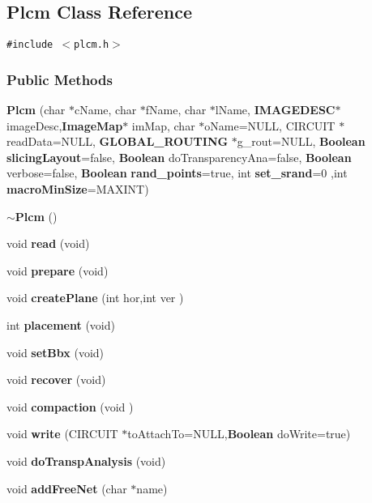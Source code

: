 \subsection{Plcm  Class Reference}
\label{Plcm}
{\tt \#include $<$plcm.h$>$}

\subsubsection*{Public Methods}
\begin{CompactItemize}
\item 
{\bf Plcm} (char $\ast$c\-Name, char $\ast$f\-Name, char $\ast$l\-Name, {\bf IMAGEDESC}$\ast$ image\-Desc,{\bf Image\-Map}$\ast$ im\-Map, char $\ast$o\-Name=NULL, CIRCUIT $\ast$read\-Data=NULL, {\bf GLOBAL\_\-ROUTING} $\ast$g\_\-rout=NULL, {\bf Boolean} {\bf slicing\-Layout}=false, {\bf Boolean} do\-Transparency\-Ana=false, {\bf Boolean} verbose=false, {\bf Boolean} {\bf rand\_\-points}=true, int {\bf set\_\-srand}=0 ,int {\bf macro\-Min\-Size}=MAXINT)
\item 
{\bf $\sim$Plcm} ()
\item 
void {\bf read} (void)
\item 
void {\bf prepare} (void)
\item 
void {\bf create\-Plane} (int hor,int ver )
\item 
int {\bf placement} (void)
\item 
void {\bf set\-Bbx} (void)
\item 
void {\bf recover} (void)
\item 
void {\bf compaction} (void )
\item 
void {\bf write} (CIRCUIT $\ast$to\-Attach\-To=NULL,{\bf Boolean} do\-Write=true)
\item 
void {\bf do\-Transp\-Analysis} (void)
\item 
void {\bf add\-Free\-Net} (char $\ast$name)
\end{CompactItemize}
